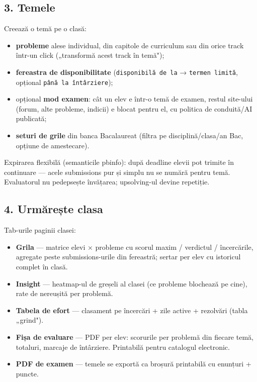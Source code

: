 \documentclass[
]{article}
\providecommand{\tightlist}{%
  \setlength{\itemsep}{0pt}\setlength{\parskip}{0pt}}
\begin{document}
\subsection{3. Temele}\label{3-temele}

Creează o temă pe o clasă:

\begin{itemize}
\tightlist
\item
  \textbf{probleme} alese individual, din capitole de curriculum sau din
  orice track într-un click („transformă acest track în temă");
\item
  \textbf{fereastra de disponibilitate} (\texttt{disponibilă\ de\ la} →
  \texttt{termen\ limită}, opțional \texttt{până\ la\ întârziere});
\item
  opțional \textbf{mod examen}: cât un elev e într-o temă de examen,
  restul site-ului (forum, alte probleme, indicii) e blocat pentru el,
  cu politica de conduită/AI publicată;
\item
  \textbf{seturi de grile} din banca Bacalaureat (filtra pe
  disciplină/clasa/an Bac, opțiune de amestecare).
\end{itemize}

Expirarea flexibilă (semanticile pbinfo): după deadline elevii pot
trimite în continuare --- acele submissions pur și simplu nu se numără
pentru temă. Evaluatorul nu pedepsește învățarea; upsolving-ul devine
repetiție.

\subsection{4. Urmărește clasa}\label{4-urmux103reux219te-clasa}

Tab-urile paginii clasei:

\begin{itemize}
\tightlist
\item
  \textbf{Grila} --- matrice elevi × probleme cu scorul maxim /
  verdictul / încercările, agregate peste submissions-urile din
  fereastră; sertar per elev cu istoricul complet în clasă.
\item
  \textbf{Insight} --- heatmap-ul de greșeli al clasei (ce probleme
  blochează pe cine), rate de nereușită per problemă.
\item
  \textbf{Tabela de efort} --- clasament pe încercări + zile active +
  rezolvări (tabla „grind").
\item
  \textbf{Fișa de evaluare} --- PDF per elev: scorurile per problemă din
  fiecare temă, totaluri, marcaje de întârziere. Printabilă pentru
  catalogul electronic.
\item
  \textbf{PDF de examen} --- temele se exportă ca broșură printabilă cu
  enunțuri + puncte.
\end{itemize}
\end{document}
